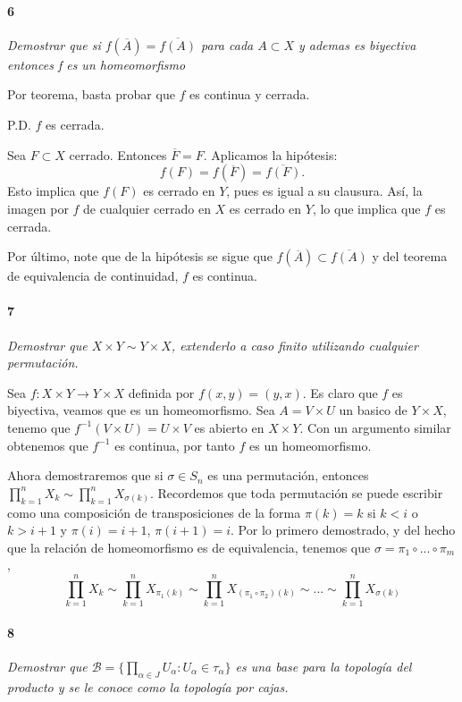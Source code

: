 \documentclass[12pt]{article}
\begin{document}
\paragraph{6}
\textit{Demostrar que si $f(\overline{A})=\overline{f(A)}$ para cada $A\subset X$ y ademas es biyectiva entonces f es un homeomorfismo}

Por teorema, basta probar que \( f \) es continua y cerrada.

P.D. \( f \) es cerrada.

Sea \( F \subset X \) cerrado. Entonces \( \overline{F} = F \). Aplicamos la hipótesis:
\[
f(F) = f(\overline{F}) = \overline{f(F)}.
\]
Esto implica que \( f(F) \) es cerrado en \( Y \), pues es igual a su clausura.  
Así, la imagen por \( f \) de cualquier cerrado en \( X \) es cerrado en \( Y \),  
lo que implica que \( f \) es cerrada.

Por último, note que de la hipótesis se sigue que $f(\overline{A}) \subset \overline{f(A)}$ y del teorema de equivalencia de continuidad, $f$ es continua.

\paragraph{7}
\textit{Demostrar que $X\times Y \sim Y \times X$, extenderlo a caso finito utilizando cualquier permutación.}

Sea $f: X \times Y \to Y \times X$ definida por $f(x,y)=(y,x)$. Es claro que $f$ es biyectiva, veamos que es un homeomorfismo. Sea $A=V \times U$ un basico de $Y \times X$, 
tenemo que $f^{-1}(V \times U)=U \times V$ es abierto en $X \times Y$. Con un argumento similar obtenemos que $f^{-1}$ es continua, por tanto $f$ es un homeomorfismo.

Ahora demostraremos que si $\sigma \in S_n$ es una permutación, entonces $\prod_{k=1}^{n} X_k \sim \prod_{k=1}^{n} X_{\sigma(k)}$.
Recordemos que toda permutación se puede escribir como una composición de transposiciones de la forma $\pi(k)=k$ si $k<i$ o $k>i+1$ y $\pi(i)=i+1$, $\pi(i+1)=i$. Por lo primero demostrado,
y del hecho que la relación de homeomorfismo es de equivalencia, tenemos que $\sigma=\pi_1 \circ ...\circ \pi_m$, $$\prod_{k=1}^{n} X_k \sim \prod_{k=1}^{n} X_{\pi_1(k)} \sim \prod_{k=1}^{n} X_{(\pi_1 \circ \pi_2)(k)} \sim ... \sim \prod_{k=1}^{n} X_{\sigma(k)}$$

\paragraph{8}
\textit{Demostrar que $\mathcal{B} = \{\prod\limits_{\alpha\in J}U_\alpha : U_\alpha\in\tau_\alpha\}$ es una base para la topología del producto y se le conoce como la topología por cajas.}
\end{document}
